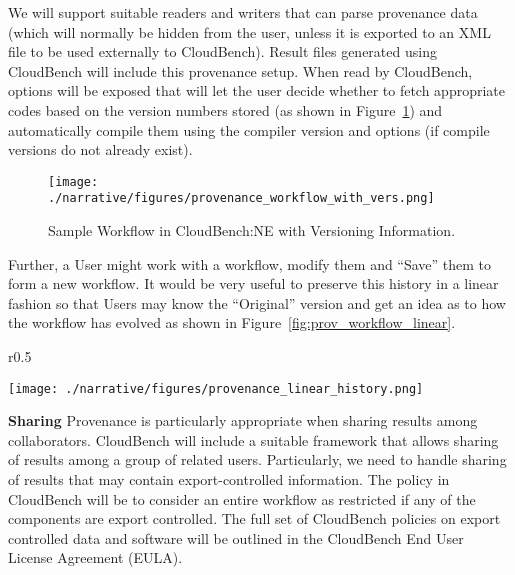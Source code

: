 We will support suitable readers and writers that can parse provenance data (which will normally be hidden from the user, unless it is exported to an XML file to be used externally to CloudBench). 
Result files generated using CloudBench will include this provenance setup. 
When read by CloudBench, options will be exposed that will let the user decide 
whether to fetch appropriate codes based on the version numbers stored (as 
shown in Figure~\ref{fig:prov_workflow_with_vers}) and automatically compile 
them using the compiler version and options (if compile versions do not already exist).

\begin{figure}[thb]
\begin{center}
\leavevmode
\texttt{[image: ./narrative/figures/provenance\_workflow\_with\_vers.png]}
\end{center}
\caption{Sample Workflow in CloudBench:NE with Versioning Information.}
\label{fig:prov_workflow_with_vers}
\end{figure}

Further, a User might work with a workflow, modify them and ``Save'' them to 
form a new workflow. It would be very useful to preserve this history in a 
linear fashion so that Users may know the ``Original'' version and get an 
idea as to how the workflow has evolved as shown in 
Figure~\ref{fig:prov_workflow_linear}.

\begin{wrapfigure}{r}{0.5\linewidth}%
\begin{center}
\leavevmode
\texttt{[image: ./narrative/figures/provenance\_linear\_history.png]}
\end{center}
\caption{Linear History of Provenance.}
\label{fig:prov_workflow_linear}
\end{wrapfigure}

\textbf{Sharing}
\label{subsec:sharing}
Provenance is particularly appropriate when sharing results among 
collaborators. CloudBench will include a suitable framework that 
allows sharing of results among a group of related users. Particularly, we need 
to handle sharing of results that may contain export-controlled information. 
The policy in CloudBench will be to consider an entire workflow as restricted 
 if any of the components are export controlled. The full set of CloudBench policies on export controlled data and software will be outlined in the CloudBench End User License Agreement (EULA).

